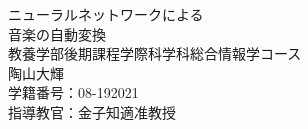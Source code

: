 \begin{titlepage}
\begin{center}
\vspace*{160truept}
{\huge ニューラルネットワークによる}\\
\vspace{10truept}
{\huge 音楽の自動変換}\\
\vspace{200truept}
{\Large 教養学部後期課程学際科学科総合情報学コース}\\
\vspace{10truept}
{\Large 陶山大輝}\\
\vspace{10truept}
{\Large 学籍番号：08-192021}\\
\vspace{10truept}
{\Large 指導教官：金子知適准教授}\\  
\end{center}
\end{titlepage}